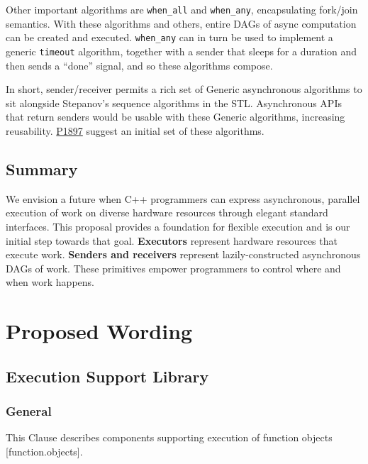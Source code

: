 \documentclass[a4paper,12pt,notitlepage,twoside,openright]{article}
\begin{document}
Other important algorithms are \texttt{when_all} and
\texttt{when_any}, encapsulating fork/join semantics. With
these algorithms and others, entire DAGs of async computation can be
created and executed. \texttt{when_any} can in turn be used
to implement a generic \texttt{timeout} algorithm, together
with a sender that sleeps for a duration and then sends a ``done''
signal, and so these algorithms compose.

In short, sender/receiver permits a rich set of Generic asynchronous
algorithms to sit alongside Stepanov's sequence algorithms in the STL.
Asynchronous APIs that return senders would be usable with these Generic
algorithms, increasing reusability. \href{http://wg21.link/P1897}{P1897}
suggest an initial set of these algorithms.

\hypertarget{summary}{%
\subsection{Summary}\label{summary}}

We envision a future when C++ programmers can express asynchronous,
parallel execution of work on diverse hardware resources through elegant
standard interfaces. This proposal provides a foundation for flexible
execution and is our initial step towards that goal. \textbf{Executors}
represent hardware resources that execute work. \textbf{Senders and
receivers} represent lazily-constructed asynchronous DAGs of work. These
primitives empower programmers to control where and when work happens.

\hypertarget{proposed-wording}{%
\section{Proposed Wording}\label{proposed-wording}}

\hypertarget{execution-support-library}{%
\subsection{Execution Support Library}\label{execution-support-library}}

\hypertarget{general}{%
\subsubsection{General}\label{general}}

This Clause describes components supporting execution of function
objects {[}function.objects{]}.
\end{document}
